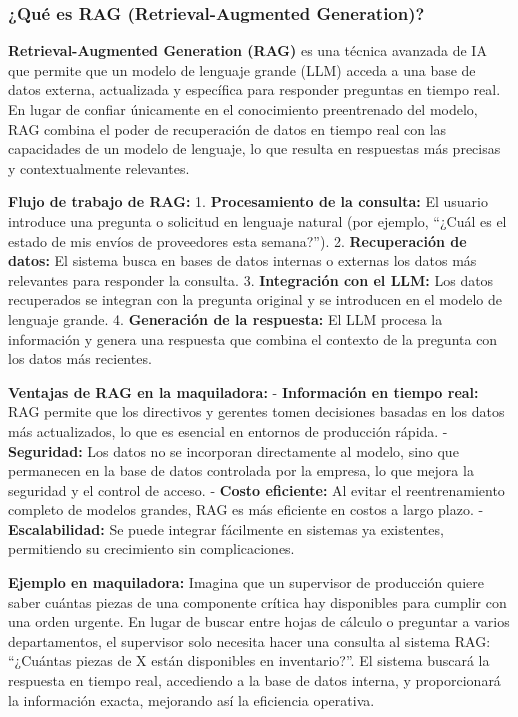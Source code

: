 \documentclass[
  10pt,
  letterpaper,
]{book}
\begin{document}
\subsubsection{\texorpdfstring{\textbf{¿Qué es RAG (Retrieval-Augmented
Generation)?}}{¿Qué es RAG (Retrieval-Augmented Generation)?}}\label{quuxe9-es-rag-retrieval-augmented-generation}

\textbf{Retrieval-Augmented Generation (RAG)} es una técnica avanzada de
IA que permite que un modelo de lenguaje grande (LLM) acceda a una base
de datos externa, actualizada y específica para responder preguntas en
tiempo real. En lugar de confiar únicamente en el conocimiento
preentrenado del modelo, RAG combina el poder de recuperación de datos
en tiempo real con las capacidades de un modelo de lenguaje, lo que
resulta en respuestas más precisas y contextualmente relevantes.

\textbf{Flujo de trabajo de RAG:} 1. \textbf{Procesamiento de la
consulta:} El usuario introduce una pregunta o solicitud en lenguaje
natural (por ejemplo, ``¿Cuál es el estado de mis envíos de proveedores
esta semana?''). 2. \textbf{Recuperación de datos:} El sistema busca en
bases de datos internas o externas los datos más relevantes para
responder la consulta. 3. \textbf{Integración con el LLM:} Los datos
recuperados se integran con la pregunta original y se introducen en el
modelo de lenguaje grande. 4. \textbf{Generación de la respuesta:} El
LLM procesa la información y genera una respuesta que combina el
contexto de la pregunta con los datos más recientes.

\textbf{Ventajas de RAG en la maquiladora:} - \textbf{Información en
tiempo real:} RAG permite que los directivos y gerentes tomen decisiones
basadas en los datos más actualizados, lo que es esencial en entornos de
producción rápida. - \textbf{Seguridad:} Los datos no se incorporan
directamente al modelo, sino que permanecen en la base de datos
controlada por la empresa, lo que mejora la seguridad y el control de
acceso. - \textbf{Costo eficiente:} Al evitar el reentrenamiento
completo de modelos grandes, RAG es más eficiente en costos a largo
plazo. - \textbf{Escalabilidad:} Se puede integrar fácilmente en
sistemas ya existentes, permitiendo su crecimiento sin complicaciones.

\textbf{Ejemplo en maquiladora:} Imagina que un supervisor de producción
quiere saber cuántas piezas de una componente crítica hay disponibles
para cumplir con una orden urgente. En lugar de buscar entre hojas de
cálculo o preguntar a varios departamentos, el supervisor solo necesita
hacer una consulta al sistema RAG: ``¿Cuántas piezas de X están
disponibles en inventario?''. El sistema buscará la respuesta en tiempo
real, accediendo a la base de datos interna, y proporcionará la
información exacta, mejorando así la eficiencia operativa.
\end{document}
